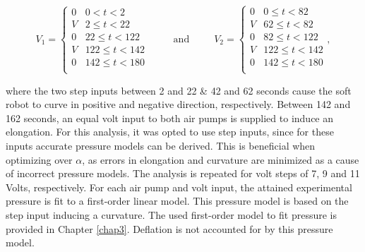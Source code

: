 \begin{equation}
    V_1 =
\begin{cases}
0 & 0 < t < 2\\
V & 2 \leq t < 22\\
0 & 22 \leq t < 122\\
V & 122 \leq t < 142\\
0 & 142 \leq t < 180\\
\end{cases} \hspace{30pt} \text{and} \hspace{30pt}      V_2 =
\begin{cases}
0 & 0 \leq t < 82\\
V & 62 \leq t < 82\\
0 & 82 \leq t < 122\\
V & 122 \leq t < 142\\
0 & 142 \leq t < 180\\
\end{cases} ,
\end{equation}

where the two step inputs between 2 and 22 \& 42 and 62 seconds cause the soft robot to curve in positive and negative direction, respectively. Between 142 and 162 seconds, an equal volt input to both air pumps is supplied to induce an elongation. For this analysis, it was opted to use step inputs, since for these inputs accurate pressure models can be derived. This is beneficial when optimizing over $\alpha$, as errors in elongation and curvature are minimized as a cause of incorrect pressure models. The analysis is repeated for volt steps of 7, 9 and 11 Volts, respectively. For each air pump and volt input, the attained experimental pressure is fit to a first-order linear model. This pressure model is based on the step input inducing a curvature. The used first-order model to fit pressure is provided in Chapter \ref{chap3}. Deflation is not accounted for by this pressure model. 

